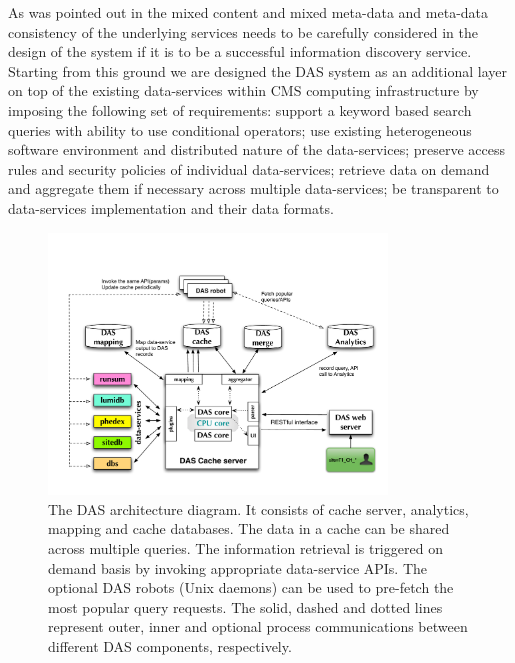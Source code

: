 \documentclass[1p,times]{elsarticle}
\begin{document}
As was pointed out in \cite{Arms} the mixed content and 
mixed meta-data and meta-data consistency 
of the underlying services needs to be carefully
considered in the design of the system if it is to be a successful information 
discovery service.
Starting from this ground we are designed the DAS system as an
additional layer on top of the existing data-services
within CMS computing infrastructure by imposing the following set of requirements:
support a keyword based search queries with ability to use conditional operators;
use existing heterogeneous software environment and distributed nature of the data-services;
preserve access rules and security policies of individual data-services;
retrieve data on demand and aggregate them if necessary across
multiple data-services;
be transparent to data-services implementation and their data formats.
\begin{figure}[htb]
\centering
\includegraphics[width=90mm]{DAS_Cache_and_Analytics.pdf}
\caption{
The DAS architecture diagram. It consists of cache server,
analytics, mapping and cache databases. The data in a cache can be shared
across multiple queries. The information retrieval is triggered
on demand basis by invoking appropriate data-service APIs. The
optional DAS robots (Unix daemons) can be used to pre-fetch
the most popular query requests. The solid, dashed and dotted lines 
represent outer, inner and optional process communications between
different DAS components, respectively.
}
\label{DAS_cache}
\end{figure}
\end{document}

